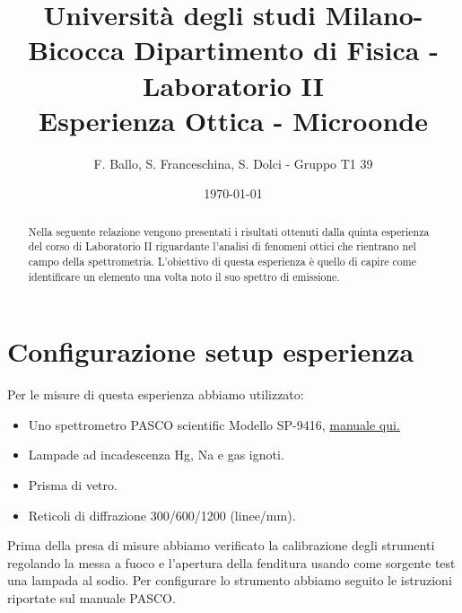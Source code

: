 \documentclass[letterpaper,12pt]{article}
\begin{document}
\title{{\small Università degli studi Milano-Bicocca  Dipartimento di Fisica - Laboratorio II }\\
	Esperienza Ottica - Microonde}
\author{F. Ballo, S. Franceschina, S. Dolci - Gruppo T1 39}
\date{\today}
\maketitle
\thispagestyle{logoheader}


\begin{abstract}
	Nella seguente relazione vengono presentati i risultati ottenuti dalla quinta esperienza del corso di 
    Laboratorio II riguardante l'analisi di fenomeni ottici che rientrano nel campo della spettrometria. L'obiettivo di questa esperienza è quello di capire come
    identificare un elemento una volta noto il suo spettro di emissione.
	\begin{adjustwidth}{-1cm}{-1cm}
	\end{adjustwidth}
\end{abstract}
\tableofcontents
\newpage

\section{Configurazione setup esperienza}
Per le misure di questa esperienza abbiamo utilizzato:

\begin{itemize}
    \item Uno spettrometro PASCO scientific Modello SP-9416, \href{https://cdn.pasco.com/product_document/Student-Spectrometer-Manual-SP-9268A.pdf}{manuale qui.}
    \item Lampade ad incadescenza Hg, Na e gas ignoti.
    \item Prisma di vetro.
    \item Reticoli di diffrazione 300/600/1200 (linee/mm).
\end{itemize}

Prima della presa di misure abbiamo verificato la calibrazione degli strumenti regolando la messa a fuoco e 
l'apertura della fenditura usando come sorgente test una lampada al sodio. Per configurare lo strumento abbiamo
seguito le istruzioni riportate sul manuale PASCO. \\
    
\end{document}
